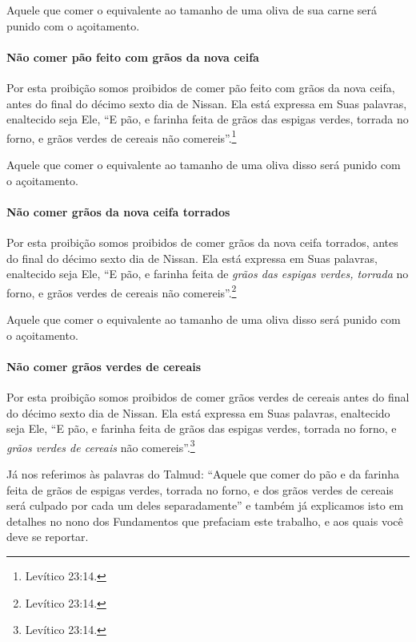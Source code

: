 Aquele que comer o equivalente ao tamanho de uma oliva de sua carne será
punido com o açoitamento.


\paragraph{Não comer pão feito com grãos da nova ceifa}

Por esta proibição somos proibidos de comer pão feito com grãos da nova
ceifa, antes do final do décimo sexto dia de Nissan. Ela está expressa
em Suas palavras, enaltecido seja Ele, ``E pão, e farinha feita de grãos
das espigas verdes, torrada no forno, e grãos verdes de cereais não
comereis''.\footnote{Levítico 23:14.}

Aquele que comer o equivalente ao tamanho de uma oliva disso será punido
com o açoitamento.

\paragraph{Não comer grãos da nova ceifa torrados}

Por esta proibição somos proibidos de comer grãos da nova ceifa
torrados, antes do final do décimo sexto dia de Nissan. Ela está
expressa em Suas palavras, enaltecido seja Ele, ``E pão, e farinha feita
de \emph{grãos das espigas verdes, torrada} no forno, e grãos verdes de
cereais não comereis''.\footnote{Levítico 23:14.}

Aquele que comer o equivalente ao tamanho de uma oliva disso será punido
com o açoitamento.

\paragraph{Não comer grãos verdes de cereais}

Por esta proibição somos proibidos de comer grãos verdes de cereais
antes do final do décimo sexto dia de Nissan. Ela está expressa em Suas
palavras, enaltecido seja Ele, ``E pão, e farinha feita de grãos das
espigas verdes, torrada no forno, e \emph{grãos verdes de cereais} não
comereis''.\footnote{Levítico 23:14.}

Já nos referimos às palavras do Talmud: ``Aquele que comer do pão e da
farinha feita de grãos de espigas verdes, torrada no forno, e dos grãos
verdes de cereais será culpado por cada um deles separadamente'' e
também já explicamos isto em detalhes no nono dos Fundamentos que
prefaciam este trabalho, e aos quais você deve se reportar.

